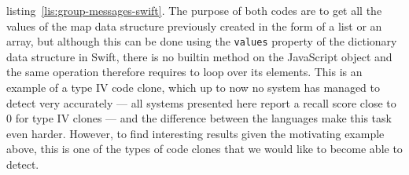 listing~\ref{lis:group-messages-swift}. The purpose of both codes are to get all
the values of the map data structure previously created in the form of a list or
an array, but although this can be done using the \lstinline{values} property of
the dictionary data structure in Swift, there is no builtin method on the
JavaScript object and the same operation therefore requires to loop over its
elements. This is an example of a type IV code clone, which up to now no system
has managed to detect very accurately --- all systems presented here report a
recall score close to $0$ for type IV clones --- and the difference between the
languages make this task even harder. However, to find interesting results
given the motivating example above, this is one of the types of code clones that
we would like to become able to detect.

